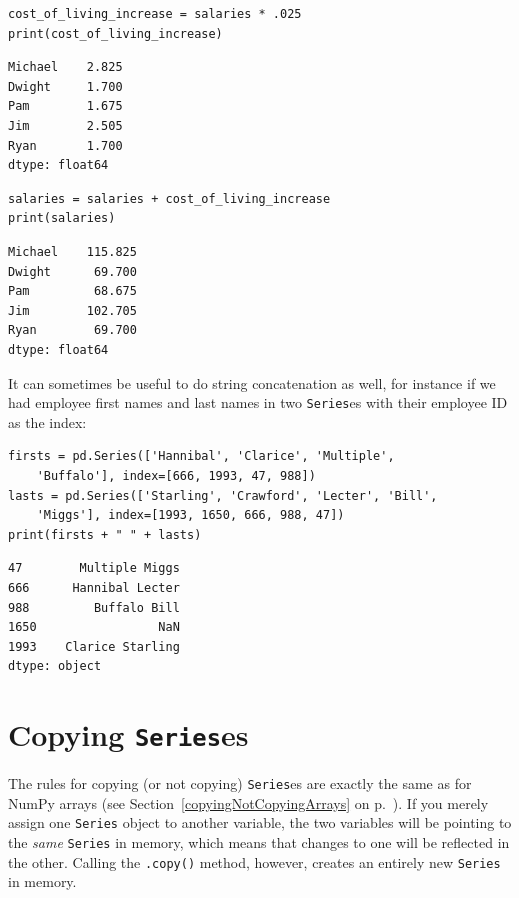 \begin{Verbatim}[fontsize=\small,samepage=true,frame=single,framesep=3mm]
cost_of_living_increase = salaries * .025
print(cost_of_living_increase)
\end{Verbatim}

\begin{Verbatim}[fontsize=\small,samepage=true,frame=leftline,framesep=5mm,framerule=1mm]
Michael    2.825
Dwight     1.700
Pam        1.675
Jim        2.505
Ryan       1.700
dtype: float64
\end{Verbatim}

\begin{Verbatim}[fontsize=\small,samepage=true,frame=single,framesep=3mm]
salaries = salaries + cost_of_living_increase
print(salaries)
\end{Verbatim}

\begin{Verbatim}[fontsize=\small,samepage=true,frame=leftline,framesep=5mm,framerule=1mm]
Michael    115.825
Dwight      69.700
Pam         68.675
Jim        102.705
Ryan        69.700
dtype: float64
\end{Verbatim}

It can sometimes be useful to do string concatenation as well, for instance if
we had employee first names and last names in two \texttt{Series}es with their
employee ID as the index:

\begin{Verbatim}[fontsize=\footnotesize,samepage=true,frame=single,framesep=3mm]
firsts = pd.Series(['Hannibal', 'Clarice', 'Multiple',
    'Buffalo'], index=[666, 1993, 47, 988])
lasts = pd.Series(['Starling', 'Crawford', 'Lecter', 'Bill',
    'Miggs'], index=[1993, 1650, 666, 988, 47])
print(firsts + " " + lasts)
\end{Verbatim}

\begin{Verbatim}[fontsize=\small,samepage=true,frame=leftline,framesep=5mm,framerule=1mm]
47        Multiple Miggs
666      Hannibal Lecter
988         Buffalo Bill
1650                 NaN
1993    Clarice Starling
dtype: object
\end{Verbatim}

\section{Copying \texttt{Series}es}

The rules for copying (or not copying) \texttt{Series}es are exactly the same
as for NumPy arrays (see Section~\ref{copyingNotCopyingArrays} on
p.~\pageref{copyingNotCopyingArrays}). If you merely assign one \texttt{Series}
object to another variable, the two variables will be pointing to the
\textit{same} \texttt{Series} in memory, which means that changes to one will
be reflected in the other. Calling the \texttt{.copy()} method, however,
creates an entirely new \texttt{Series} in memory.

